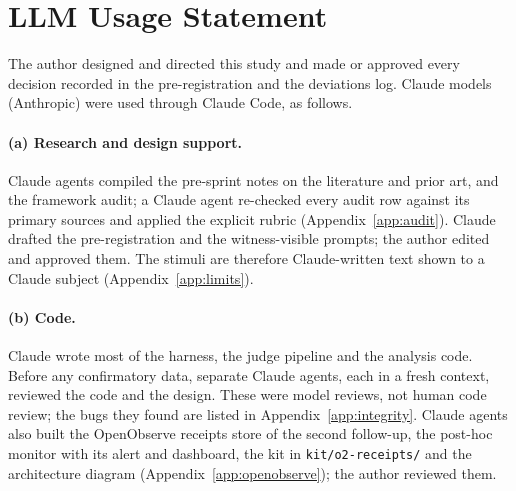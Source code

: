 \section*{LLM Usage Statement}\label{app:llm}
The author designed and directed this study and made or approved every decision recorded in the pre-registration and the deviations log.
Claude models (Anthropic) were used through Claude Code, as follows.

\paragraph{(a) Research and design support.}
Claude agents compiled the pre-sprint notes on the literature and prior art, and the framework audit; a Claude agent re-checked every audit row against its primary sources and applied the explicit rubric (Appendix~\ref{app:audit}).
Claude drafted the pre-registration and the witness-visible prompts; the author edited and approved them.
The stimuli are therefore Claude-written text shown to a Claude subject (Appendix~\ref{app:limits}).

\paragraph{(b) Code.}
Claude wrote most of the harness, the judge pipeline and the analysis code.
Before any confirmatory data, separate Claude agents, each in a fresh context, reviewed the code and the design.
These were model reviews, not human code review; the bugs they found are listed in Appendix~\ref{app:integrity}.
Claude agents also built the OpenObserve receipts store of the second follow-up, the post-hoc monitor with its alert and dashboard, the kit in \texttt{kit/o2-receipts/} and the architecture diagram (Appendix~\ref{app:openobserve}); the author reviewed them.

